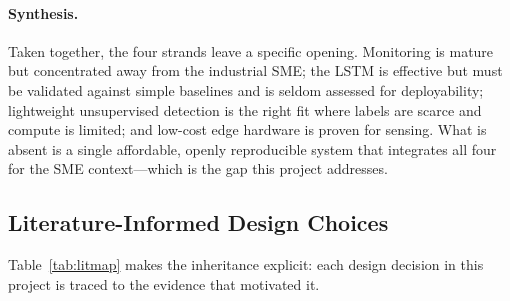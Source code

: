 \documentclass[11pt,a4paper]{article}
\begin{document}
\paragraph{Synthesis.}
Taken together, the four strands leave a specific opening. Monitoring is mature
but concentrated away from the industrial SME; the LSTM is effective but must be
validated against simple baselines and is seldom assessed for deployability;
lightweight unsupervised detection is the right fit where labels are scarce and
compute is limited; and low-cost edge hardware is proven for sensing. What is
absent is a single affordable, openly reproducible system that integrates all
four for the SME context---which is the gap this project addresses.

\subsection{Literature-Informed Design Choices}
Table~\ref{tab:litmap} makes the inheritance explicit: each design decision in
this project is traced to the evidence that motivated it.
\end{document}
